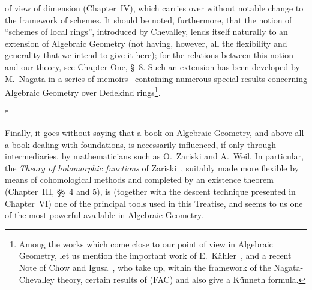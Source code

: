 of view of dimension (Chapter~IV), which carries over without notable change to the framework of schemes.
It should be noted, furthermore, that the notion of ``schemes of local rings'', introduced by Chevalley, lends itself naturally to an extension of Algebraic Geometry (not having, however, all the flexibility and generality that we intend to give it here); for the relations between this notion and our theory, see Chapter One, \S~8.
Such an extension has been developed by M.~Nagata in a series of memoirs~\cite{I-9} containing numerous special results concerning Algebraic Geometry over Dedekind rings\footnote{Among the works which come close to our point of view in Algebraic Geometry, let us mention the important work of E.~Kähler~\cite{I-22}, and a recent Note of Chow and Igusa~\cite{I-3}, who take up, within the framework of the Nagata-Chevalley theory, certain results of (FAC) and also give a Künneth formula.}.

\bigskip
\begin{center}*\quad*\quad*\end{center}
\bigskip

Finally, it goes without saying that a book on Algebraic Geometry, and above all a book dealing with foundations, is necessarily influenced, if only through intermediaries, by mathematicians such as O.~Zariski and A.~Weil.
In particular, the \emph{Theory of holomorphic functions} of Zariski~\cite{I-20}, suitably made more flexible by means of cohomological methods and completed by an existence theorem (Chapter~III, \S\S~4 and 5), is (together with the descent technique presented in Chapter~VI) one of the principal tools used in this Treatise, and seems to us one of the most powerful available in Algebraic Geometry.

